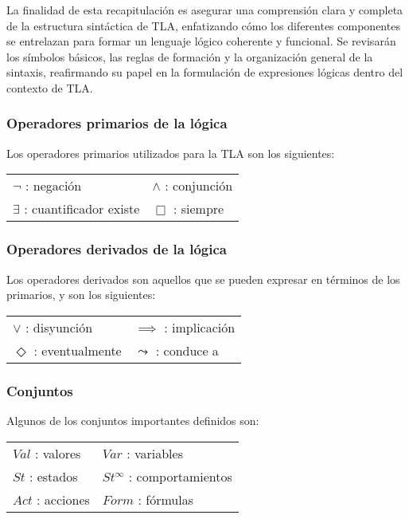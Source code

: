 La finalidad de esta recapitulación es asegurar una comprensión clara y completa de la estructura sintáctica de TLA, enfatizando cómo los diferentes componentes se entrelazan para formar un lenguaje lógico coherente y funcional. Se revisarán los símbolos básicos, las reglas de formación y la organización general de la sintaxis, reafirmando su papel en la formulación de expresiones lógicas dentro del contexto de TLA.

\subsubsection{Operadores primarios de la lógica}
\noindent
Los operadores primarios utilizados para la TLA son los siguientes:
\vspace{0.2cm}
\newline
\begin{tabular}{ll}
  $\neg$ : negación & $\land$ : conjunción \\
  $\exists$ : cuantificador existe & $\Box$ : siempre\\
\end{tabular}

\subsubsection{Operadores derivados de la lógica}
\noindent
Los operadores derivados son aquellos que se pueden expresar en términos de los primarios, y son los siguientes:
\vspace{0.2cm}
\newline
\begin{tabular}{ll}
  $\lor$ : disyunción & $\implies$ : implicación \\
  $\Diamond$ : eventualmente & $\leadsto$ : conduce a\\
\end{tabular}

\subsubsection{Conjuntos}
\noindent
Algunos de los conjuntos importantes definidos son:
\vspace{0.2cm}
\newline
\begin{tabular}{ll}
  $Val$ : valores & $Var$ : variables \\
  $St$ : estados & $St^\infty$ : comportamientos \\
  $Act$ : acciones & $Form$ : fórmulas \\
\end{tabular}

